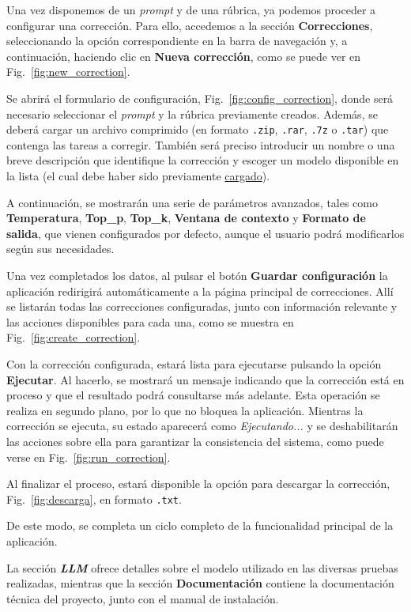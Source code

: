 Una vez disponemos de un \textit{prompt} y de una rúbrica, ya podemos proceder a configurar una corrección. Para ello, accedemos a la sección \textbf{Correcciones}, seleccionando la opción correspondiente en la barra de navegación y, a continuación, haciendo clic en \textbf{Nueva corrección}, como se puede ver en Fig.~\ref{fig:new_correction}.


Se abrirá el formulario de configuración, Fig.~\ref{fig:config_correction}, donde será necesario seleccionar el \textit{prompt} y la rúbrica previamente creados. Además, se deberá cargar un archivo comprimido (en formato \texttt{.zip}, \texttt{.rar}, \texttt{.7z} o \texttt{.tar}) que contenga las tareas a corregir. También será preciso introducir un nombre o una breve descripción que identifique la corrección y escoger un modelo disponible en la lista (el cual debe haber sido previamente \hyperref[sec:pull_model]{cargado}).

A continuación, se mostrarán una serie de parámetros avanzados, tales como \textbf{Temperatura}, \textbf{Top\_p}, \textbf{Top\_k}, \textbf{Ventana de contexto} y \textbf{Formato de salida}, que vienen configurados por defecto, aunque el usuario podrá modificarlos según sus necesidades.


Una vez completados los datos, al pulsar el botón \textbf{Guardar configuración} la aplicación redirigirá automáticamente a la página principal de correcciones. Allí se listarán todas las correcciones configuradas, junto con información relevante y las acciones disponibles para cada una, como se muestra en Fig.~\ref{fig:create_correction}.


Con la corrección configurada, estará lista para ejecutarse pulsando la opción \textbf{Ejecutar}. Al hacerlo, se mostrará un mensaje indicando que la corrección está en proceso y que el resultado podrá consultarse más adelante. Esta operación se realiza en segundo plano, por lo que no bloquea la aplicación. Mientras la corrección se ejecuta, su estado aparecerá como \textit{Ejecutando...} y se deshabilitarán las acciones sobre ella para garantizar la consistencia del sistema, como puede verse en Fig.~\ref{fig:run_correction}.


Al finalizar el proceso, estará disponible la opción para descargar la corrección, Fig.~\ref{fig:descarga}, en formato \texttt{.txt}.


De este modo, se completa un ciclo completo de la funcionalidad principal de la aplicación.

La sección \textbf{\textit{LLM}} ofrece detalles sobre el modelo utilizado en las diversas pruebas realizadas, mientras que la sección \textbf{Documentación} contiene la documentación técnica del proyecto, junto con el manual de instalación.
